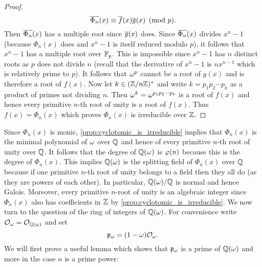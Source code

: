 \begin{proof}
      \[
        \overline{\Phi_{n}}(x) \equiv \overline{f}(x)\overline{g}(x) \pmod{p}.
      \]
      Then $\overline{\Phi_{n}}(x)$ has a multiple root since $\overline{g}(x)$ does. Since $\overline{\Phi_{n}}(x)$ divides $x^{n}-1$ (because $\Phi_{n}(x)$ does and $x^{n}-1$ is itself reduced modulo $p$), it follows that $x^{n}-1$ has a multiple root over $\mathbb{F}_{p}$. This is impossible since $x^{n}-1$ has $n$ distinct roots as $p$ does not divide $n$ (recall that the derivative of $x^{n}-1$ is $nx^{n-1}$ which is relatively prime to $p$). It follows that $\omega^{p}$ cannot be a root of $g(x)$ and is therefore a root of $f(x)$. Now let $k \in (\mathbb{Z}/n\mathbb{Z})^{\ast}$ and write $k = p_{1}p_{2} \cdots p_{k}$ as a product of primes not dividing $n$. Then $\omega^{k} = \omega^{p_{1}p_{2} \cdots p_{k}}$ is a root of $f(x)$ and hence every primitive $n$-th root of unity is a root of $f(x)$. Thus $f(x) = \Phi_{n}(x)$ which proves $\Phi_{n}(x)$ is irreducible over $\mathbb{Z}$.
    \end{proof}

    Since $\Phi_{n}(x)$ is monic, \cref{prop:cyclotomic_is_irreducible} implies that $\Phi_{n}(x)$ is the minimal polynomial of $\omega$ over $\mathbb{Q}$ and hence of every primitive $n$-th root of unity over $\mathbb{Q}$. It follows that the degree of $\mathbb{Q}(\omega)$ is $\varphi(n)$ because this is the degree of $\Phi_{n}(x)$. This implies $\mathbb{Q}(\omega)$ is the splitting field of $\Phi_{n}(x)$ over $\mathbb{Q}$ because if one primitive $n$-th root of unity belongs to a field then they all do (as they are powers of each other). In particular, $\mathbb{Q}(\omega)/\mathbb{Q}$ is normal and hence Galois. Moreover, every primitive $n$-root of unity is an algebraic integer since $\Phi_{n}(x)$ also has coefficients in $\mathbb{Z}$ by \cref{prop:cyclotomic_is_irreducible}. We now turn to the question of the ring of integers of $\mathbb{Q}(\omega)$. For convenience write $\mathcal{O}_{\omega} = \mathcal{O}_{\mathbb{Q}(\omega)}$ and set
    \[
      \mathfrak{p}_{\omega} = (1-\omega)\mathcal{O}_{\omega}.
    \]
    We will first prove a useful lemma which shows that $\mathfrak{p}_{\omega}$ is a prime of $\mathbb{Q}(\omega)$ and more in the case $n$ is a prime power:

